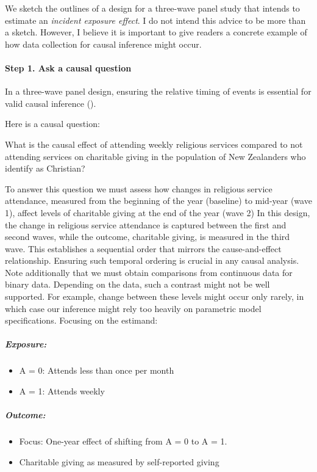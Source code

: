 \documentclass[
  singlecolumn]{article}
\let\oldparagraph\paragraph
\renewcommand{\paragraph}[1]{\oldparagraph{#1}\mbox{}}
\let\oldsubparagraph\subparagraph
\renewcommand{\subparagraph}[1]{\oldsubparagraph{#1}\mbox{}}
\providecommand{\tightlist}{%
  \setlength{\itemsep}{0pt}\setlength{\parskip}{0pt}}\usepackage{longtable,booktabs,array}
\begin{document}
We sketch the outlines of a design for a three-wave panel study that
intends to estimate an \emph{incident exposure effect}. I do not intend
this advice to be more than a sketch. However, I believe it is important
to give readers a concrete example of how data collection for causal
inference might occur.

\paragraph{Step 1. Ask a causal
question}\label{step-1.-ask-a-causal-question}

In a three-wave panel design, ensuring the relative timing of events is
essential for valid causal inference
().

Here is a causal question:

What is the causal effect of attending weekly religious services
compared to not attending services on charitable giving in the
population of New Zealanders who identify as Christian?

To answer this question we must assess how changes in religious service
attendance, measured from the beginning of the year (baseline) to
mid-year (wave 1), affect levels of charitable giving at the end of the
year (wave 2) In this design, the change in religious service attendance
is captured between the first and second waves, while the outcome,
charitable giving, is measured in the third wave. This establishes a
sequential order that mirrors the cause-and-effect relationship.
Ensuring such temporal ordering is crucial in any causal analysis. Note
additionally that we must obtain comparisons from continuous data for
binary data. Depending on the data, such a contrast might not be well
supported. For example, change between these levels might occur only
rarely, in which case our inference might rely too heavily on parametric
model specifications. Focusing on the estimand:

\subparagraph{Exposure:}\label{exposure}

\begin{itemize}
\tightlist
\item
  A = 0: Attends less than once per month
\item
  A = 1: Attends weekly
\end{itemize}

\subparagraph{Outcome:}\label{outcome}

\begin{itemize}
\tightlist
\item
  Focus: One-year effect of shifting from A = 0 to A = 1.
\item
  Charitable giving as measured by self-reported giving
\end{itemize}
\end{document}
